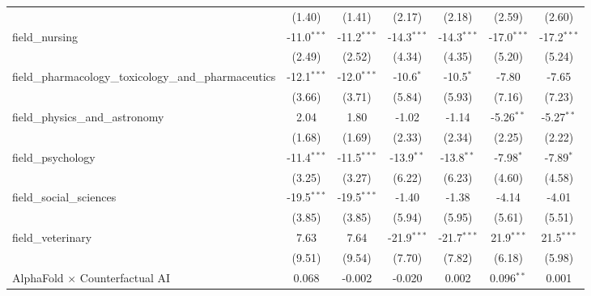 \begin{tabular}{lcccccc}
                                                               & (1.40)         & (1.41)        & (2.17)        & (2.18)        & (2.59)        & (2.60)\\   
   field\_nursing                                              & -11.0$^{***}$  & -11.2$^{***}$ & -14.3$^{***}$ & -14.3$^{***}$ & -17.0$^{***}$ & -17.2$^{***}$\\   
                                                               & (2.49)         & (2.52)        & (4.34)        & (4.35)        & (5.20)        & (5.24)\\   
   field\_pharmacology\_toxicology\_and\_pharmaceutics         & -12.1$^{***}$  & -12.0$^{***}$ & -10.6$^{*}$   & -10.5$^{*}$   & -7.80         & -7.65\\   
                                                               & (3.66)         & (3.71)        & (5.84)        & (5.93)        & (7.16)        & (7.23)\\   
   field\_physics\_and\_astronomy                              & 2.04           & 1.80          & -1.02         & -1.14         & -5.26$^{**}$  & -5.27$^{**}$\\   
                                                               & (1.68)         & (1.69)        & (2.33)        & (2.34)        & (2.25)        & (2.22)\\   
   field\_psychology                                           & -11.4$^{***}$  & -11.5$^{***}$ & -13.9$^{**}$  & -13.8$^{**}$  & -7.98$^{*}$   & -7.89$^{*}$\\   
                                                               & (3.25)         & (3.27)        & (6.22)        & (6.23)        & (4.60)        & (4.58)\\   
   field\_social\_sciences                                     & -19.5$^{***}$  & -19.5$^{***}$ & -1.40         & -1.38         & -4.14         & -4.01\\   
                                                               & (3.85)         & (3.85)        & (5.94)        & (5.95)        & (5.61)        & (5.51)\\   
   field\_veterinary                                           & 7.63           & 7.64          & -21.9$^{***}$ & -21.7$^{***}$ & 21.9$^{***}$  & 21.5$^{***}$\\   
                                                               & (9.51)         & (9.54)        & (7.70)        & (7.82)        & (6.18)        & (5.98)\\   
   AlphaFold $\times$ Counterfactual AI                        & 0.068          & -0.002        & -0.020        & 0.002         & 0.096$^{**}$  & 0.001\\   

\end{tabular}
